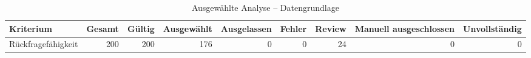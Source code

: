 \begin{table}[htbp]
\centering
\caption{Ausgewählte Analyse -- Datengrundlage}
\begin{tabular}{lrrrrrrrr}
\toprule
Kriterium & Gesamt & Gültig & Ausgewählt & Ausgelassen & Fehler & Review & Manuell ausgeschlossen & Unvollständig \\
\midrule
Rückfragefähigkeit & 200 & 200 & 176 & 0 & 0 & 24 & 0 & 0 \\
\bottomrule
\end{tabular}
\end{table}

